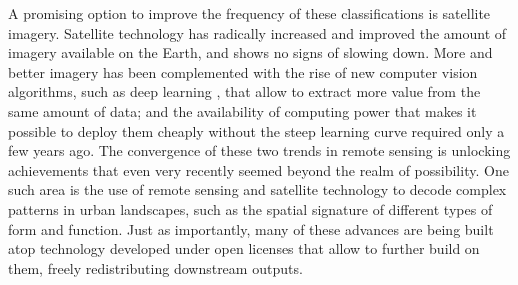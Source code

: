 A promising option to improve the frequency of these classifications is
satellite imagery.
Satellite technology has radically increased and improved the amount of
imagery available on the Earth, and shows no signs of slowing down.
More and better imagery has been complemented with the rise of new computer
vision algorithms, such as deep learning \citep{lecun2015},
that allow to extract more value from the same amount of data; and the
availability of computing power that makes it possible to deploy them cheaply
without the steep learning curve required only a few years ago.
The convergence of these two trends in remote sensing is unlocking
achievements that even very recently seemed beyond the realm of possibility.
One such area is the use of remote sensing and satellite technology to decode
complex patterns in urban landscapes, such as the spatial signature of
different types of form and function.
Just as importantly, many of these advances are being built atop
technology developed under open licenses that allow to further build on them, freely
redistributing downstream outputs.

